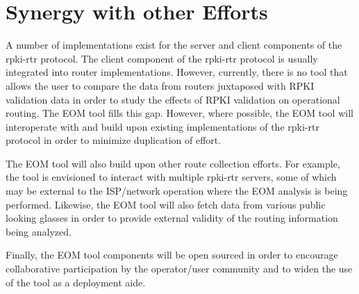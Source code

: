\section{Synergy with other Efforts}

A number of implementations exist for the server and client
components of the rpki-rtr protocol. The client component of the
rpki-rtr protocol is usually integrated into router implementations.
However, currently, there is no tool that allows the user to compare the
data from routers juxtaposed with RPKI validation data in order to study
the effects of RPKI validation on operational routing. The EOM tool
fills this gap. However, where possible, the EOM tool will interoperate
with and build upon existing implementations of the rpki-rtr protocol
in order to minimize duplication of effort.

The EOM tool will also build upon other route collection efforts. For
example, the tool is envisioned to interact with multiple rpki-rtr
servers, some of which may be external to the ISP/network operation
where the EOM analysis is being performed. Likewise, the EOM tool will
also fetch data from various public looking glasses in order to provide
external validity of the routing information being analyzed. 

Finally, the EOM tool components will be open sourced in order to
encourage collaborative participation by the operator/user community and
to widen the use of the tool as a deployment aide.
